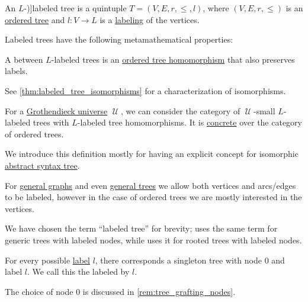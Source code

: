 \begin{definition}\label{def:labeled_tree}\mimprovised
  An \( L \)-\term[en=labeled tree (\cite[exerc. 11.1.38]{Rosen2019DiscreteMathematics})]{labeled tree} is a quintuple \( T = (V, E, r, \leq, l) \), where \( (V, E, r, \leq) \) is an \hyperref[def:ordered_tree]{ordered tree} and \( l: V \to L \) is a \hyperref[def:labeled_set]{labeling} of the vertices.

  Labeled trees have the following metamathematical properties:
  \begin{thmenum}
     A  between \( L \)-labeled trees is an \hyperref[def:ordered_tree/homomorphism]{ordered tree homomorphism} that also preserves labels.

    See \cref{thm:labeled_tree_isomorphisms} for a characterization of isomorphisms.

     For a \hyperref[def:grothendieck_universe]{Grothendieck universe} \( \mscrU \), we can consider the category of \( \mscrU \)-small \( L \)-labeled trees with \( L \)-labeled tree homomorphisms. It is \hyperref[def:concrete_category]{concrete} over the category of ordered trees.
  \end{thmenum}
\end{definition}
\begin{comments}
  \item We introduce this definition mostly for having an explicit concept for isomorphic \hyperref[con:abstract_syntax_tree]{abstract syntax tree}.

  \item For \hyperref[rem:arbitrary_kind_graph]{general graphs} and even \hyperref[def:tree]{general trees} we allow both vertices and arcs/edges to be labeled, however in the case of ordered trees we are mostly interested in the vertices.

  We have chosen the term \enquote{labeled tree} for brevity;  uses the same term for generic trees with labeled nodes, while  uses it for rooted trees with labeled nodes.
\end{comments}

\begin{definition}\label{def:canonical_singleton_tree}\mimprovised
  For every possible \hyperref[def:labeled_set]{label} \( l \), there corresponds a singleton tree with node \( 0 \) and label \( l \). We call this the  labeled by \( l \).

  The choice of node \( 0 \) is discussed in \cref{rem:tree_grafting_nodes}.
\end{definition}


